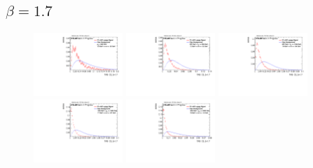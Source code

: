 \subsection*{$\beta=1.7$}
\begin{figure}
\includegraphics[width=0.3\textwidth]{sascha_input/Appendix/Distributions/w/distributions/beta17/h_assisted_tj_C2_17_bin1.pdf} \hspace{1mm}
\includegraphics[width=0.3\textwidth]{sascha_input/Appendix/Distributions/w/distributions/beta17/h_assisted_tj_C2_17_bin2.pdf} \hspace{1mm}
\includegraphics[width=0.3\textwidth]{sascha_input/Appendix/Distributions/w/distributions/beta17/h_assisted_tj_C2_17_bin3.pdf} 
\bigskip
\includegraphics[width=0.3\textwidth]{sascha_input/Appendix/Distributions/w/distributions/beta17/h_assisted_tj_C2_17_bin4.pdf} \hspace{1mm}
\includegraphics[width=0.3\textwidth]{sascha_input/Appendix/Distributions/w/distributions/beta17/h_assisted_tj_C2_17_bin5.pdf} \hspace{1mm}

\end{figure}
